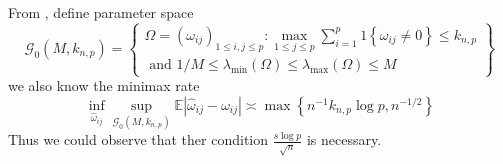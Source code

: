 \documentclass[12pt]{article}
\begin{document}
From \cite{Ren_2015}, define parameter space
\begin{equation}
\mathcal{G}_{0}\left(M, k_{n, p}\right)=\left\{\begin{aligned} \Omega=\left(\omega_{i j}\right)_{1 \leq i, j \leq p}: \max _{1 \leq j \leq p} \sum_{i=1}^{p} 1\left\{\omega_{i j} \neq 0\right\} \leq k_{n, p} \\ \text { and } 1 / M \leq \lambda_{\min }(\Omega) \leq \lambda_{\max }(\Omega) \leq M \end{aligned}\right\}
\end{equation}
 we also know the minimax rate
 \begin{equation}
 \inf _{\hat{\omega}_{i j}} \sup _{\mathcal{G}_{0}\left(M, k_{n, p}\right)} \mathbb{E}\left|\hat{\omega}_{i j}-\omega_{i j}\right| \asymp \max \left\{n^{-1} k_{n, p} \log p, n^{-1 / 2}\right\}
 \end{equation}
Thus we could observe that ther condition $\frac{s\log p}{\sqrt{n}}$ is necessary.






	
\end{document}
